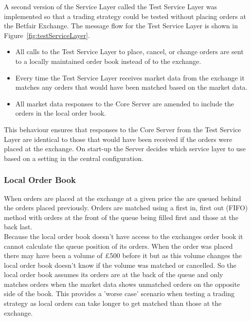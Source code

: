 		A second version of the Service Layer called the Test Service Layer was implemented so that a trading strategy could be tested without placing orders at the Betfair Exchange. The message flow for the Test Service Layer is shown in Figure~\ref{fig:testServiceLayer}.\\
		
		\begin{itemize}
			\item All calls to the Test Service Layer to place, cancel, or change orders are sent to a locally maintained order book instead of to the exchange.
			\item Every time the Test Service Layer receives market data from the exchange it matches any orders that would have been matched based on the market data.
			\item All market data responses to the Core Server are amended to include the orders in the local order book.
		\end{itemize}
		
		This behaviour ensures that responses to the Core Server from the Test Service Layer are identical to those that would have been received if the orders were placed at the exchange. On start-up the Server decides which service layer to use based on a setting in the central configuration.
		
		\subsubsection{Local Order Book}
		When orders are placed at the exchange at a given price the are queued behind the orders placed previously. Orders are matched using a first in, first out (FIFO) method with orders at the front of the queue being filled first and those at the back last.\\ 
		
		Because the local order book doesn't have access to the exchanges order book it cannot calculate the queue position of its orders. When the order was placed there may have been a volume of \pounds500 before it but as this volume changes the local order book doesn't know if the volume was matched or cancelled. So the local order book assumes its orders are at the back of the queue and only matches orders when the market data shows unmatched orders on the opposite side of the book. This provides a 'worse case' scenario when testing a trading strategy as local orders can take longer to get matched than those at the exchange.\\
		
